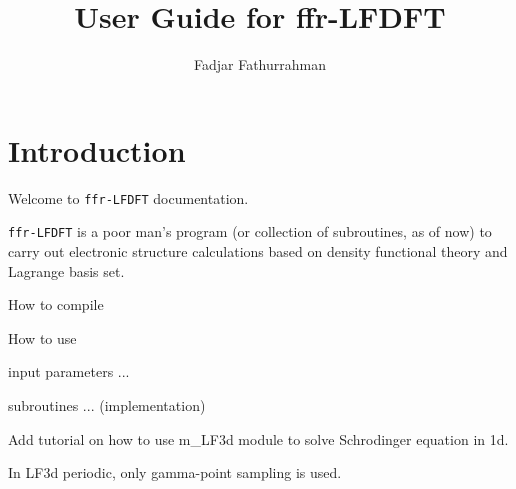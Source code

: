 \documentclass[a4paper,11pt,fleqn]{extarticle}
\begin{document}
\title{User Guide for {\ttfamily ffr-LFDFT}}
\author{Fadjar Fathurrahman}
\date{}
\maketitle

\tableofcontents

\section{Introduction}

Welcome to {\tt ffr-LFDFT} documentation.

{\tt ffr-LFDFT} is a poor man's program (or collection of subroutines, as of now)
to carry out electronic structure calculations based on density functional theory
and Lagrange basis set.

How to compile

How to use

input parameters ...

subroutines ... (implementation)

Add tutorial on how to use m\_LF3d module to solve Schrodinger equation
in 1d.

In LF3d periodic, only gamma-point sampling is used.






\appendix


\end{document}
